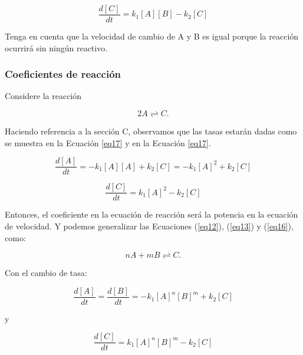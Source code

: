 \documentclass[11pt, letterpaper, spanish]{article}
\begin{document}
{    \begin{equation}
        \frac{d [C]}{d t}=k_1[A][B]-k_2[C]
    \end{equation}

    \par{Tenga en cuenta que la velocidad de cambio de A y B es igual porque la reacción ocurrirá sin ningún reactivo.}

    \subsubsection{Coeficientes de reacción}

    \par{Considere la reacción}

    \begin{equation}
        2A \rightleftharpoons C.
        \label{eq16}
    \end{equation}

    \par{Haciendo referencia a la sección C, observamos que las tasas estarán dadas como se muestra en la Ecuación \ref{eq17} y en la Ecuación \ref{eq17}. }

     \begin{equation}
        \frac{d [A]}{d t}=-k_1[A][A]+k_2[C]=-k_1{[A]}^2+k_2[C]
        \label{eq17}
    \end{equation}

    \begin{equation}
        \frac{d [C]}{d t}=k_1[A]^2-k_2[C]
        \label{eq18}
    \end{equation}

    \par{Entonces, el coeficiente en la ecuación de reacción será la potencia en la ecuación de velocidad. Y podemos generalizar las Ecuaciones  (\ref{eq12}), (\ref{eq13}) y (\ref{eq16}), como: }

    \begin{equation}
        nA+mB \rightleftharpoons C.
    \end{equation}

    \par{Con el cambio de tasa:}

    \begin{equation}
        \frac{d [A]}{d t}=\frac{d [B]}{d t}=-k_1{[A]}^n[B]^m+k_2[C]
    \end{equation}

    \par{y}

    \begin{equation}
        \frac{d [C]}{d t}=k_1[A]^n[B]^m-k_2[C]
    \end{equation}
   
}
\end{document}
